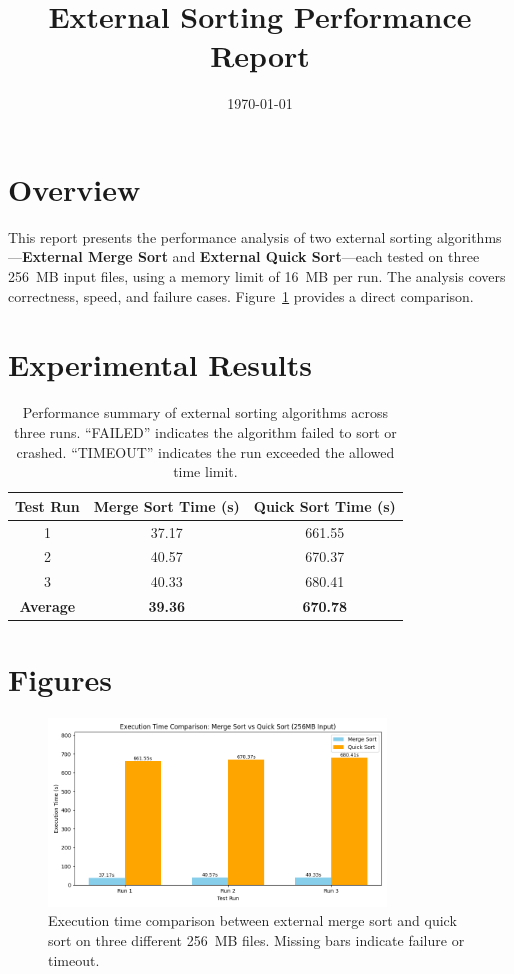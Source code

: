 \documentclass{article}
\title{External Sorting Performance Report}
\author{}
\date{\today}
\begin{document}
\maketitle

\section*{Overview}
This report presents the performance analysis of two external sorting algorithms---\textbf{External Merge Sort} and \textbf{External Quick Sort}---each tested on three 256~MB input files, using a memory limit of 16~MB per run. The analysis covers correctness, speed, and failure cases. Figure~\ref{fig:sort_times_comparison} provides a direct comparison.

\section*{Experimental Results}
\begin{table}[h!]
\centering
\begin{tabular}{c c c}
\toprule
Test Run & Merge Sort Time (s) & Quick Sort Time (s) \\
\midrule
1 & 37.17 & 661.55 \\
2 & 40.57 & 670.37 \\
3 & 40.33 & 680.41 \\
\midrule
\textbf{Average} & \textbf{39.36} & \textbf{670.78} \\
\bottomrule
\end{tabular}
\caption{Performance summary of external sorting algorithms across three runs. ``FAILED'' indicates the algorithm failed to sort or crashed. ``TIMEOUT'' indicates the run exceeded the allowed time limit.}
\label{tab:perf_summary}
\end{table}

\section*{Figures}
\begin{figure}[h!]
\centering
\includegraphics[width=0.8\textwidth]{figures/sort_times_comparison.png}
\caption{Execution time comparison between external merge sort and quick sort on three different 256~MB files. Missing bars indicate failure or timeout.}
\label{fig:sort_times_comparison}
\end{figure}
\end{document}
